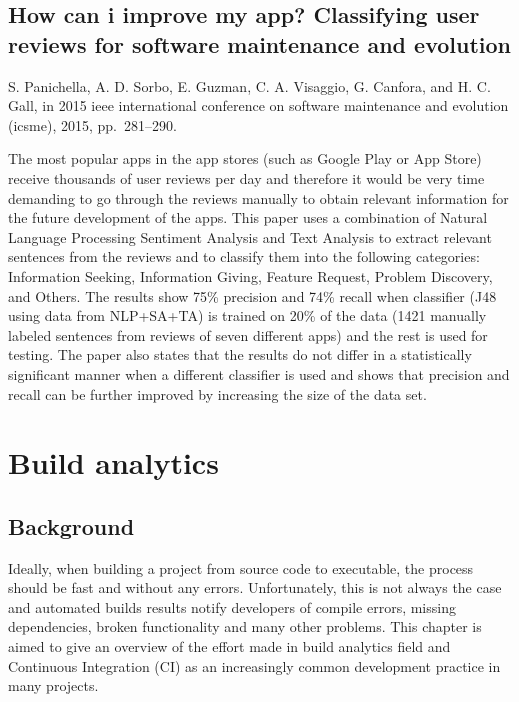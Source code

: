 \documentclass[]{book}
\begin{document}
\section{How can i improve my app? Classifying user reviews for software
maintenance and
evolution}\label{how-can-i-improve-my-app-classifying-user-reviews-for-software-maintenance-and-evolution}

S. Panichella, A. D. Sorbo, E. Guzman, C. A. Visaggio, G. Canfora, and
H. C. Gall, in 2015 ieee international conference on software
maintenance and evolution (icsme), 2015, pp.~281--290.

The most popular apps in the app stores (such as Google Play or App
Store) receive thousands of user reviews per day and therefore it would
be very time demanding to go through the reviews manually to obtain
relevant information for the future development of the apps. This paper
uses a combination of Natural Language Processing Sentiment Analysis and
Text Analysis to extract relevant sentences from the reviews and to
classify them into the following categories: Information Seeking,
Information Giving, Feature Request, Problem Discovery, and Others. The
results show 75\% precision and 74\% recall when classifier (J48 using
data from NLP+SA+TA) is trained on 20\% of the data (1421 manually
labeled sentences from reviews of seven different apps) and the rest is
used for testing. The paper also states that the results do not differ
in a statistically significant manner when a different classifier is
used and shows that precision and recall can be further improved by
increasing the size of the data set.

\chapter{Build analytics}\label{build-analytics}

\section{Background}\label{background}

Ideally, when building a project from source code to executable, the
process should be fast and without any errors. Unfortunately, this is
not always the case and automated builds results notify developers of
compile errors, missing dependencies, broken functionality and many
other problems. This chapter is aimed to give an overview of the effort
made in build analytics field and Continuous Integration (CI) as an
increasingly common development practice in many projects.
\end{document}
